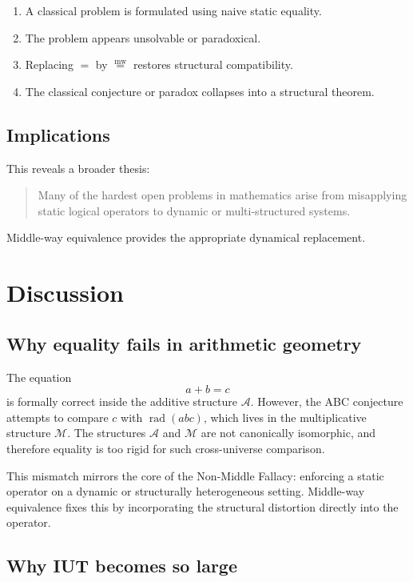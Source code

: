 \documentclass[11pt]{article}
\newcommand{\mweq}{\mathrel{\overset{\mathrm{mw}}{=}}}
\theoremstyle{definition}
\theoremstyle{remark}
\begin{document}
\begin{enumerate}
  \item A classical problem is formulated using naive static equality.
  \item The problem appears unsolvable or paradoxical.
  \item Replacing $=$ by $\mweq$ restores structural compatibility.
  \item The classical conjecture or paradox collapses into a structural
        theorem.
\end{enumerate}

\subsection{Implications}

This reveals a broader thesis:

\begin{quote}
Many of the hardest open problems in mathematics arise from misapplying
static logical operators to dynamic or multi-structured systems.
\end{quote}

Middle-way equivalence provides the appropriate dynamical replacement.


\section{Discussion}

\subsection{Why equality fails in arithmetic geometry}

The equation
\[
  a + b = c
\]
is formally correct inside the additive structure $\mathcal{A}$.
However, the ABC conjecture attempts to compare $c$ with
$\operatorname{rad}(abc)$, which lives in the multiplicative structure
$\mathcal{M}$. The structures $\mathcal{A}$ and $\mathcal{M}$ are not
canonically isomorphic, and therefore equality is too rigid for such
cross-universe comparison.

This mismatch mirrors the core of the Non-Middle Fallacy: enforcing a
static operator on a dynamic or structurally heterogeneous setting.
Middle-way equivalence fixes this by incorporating the structural
distortion directly into the operator.

\subsection{Why IUT becomes so large}
\end{document}
